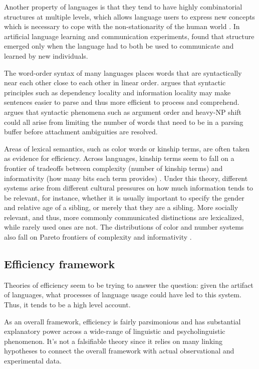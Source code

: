 \documentclass[]{article}
\begin{document}
Another property of languages is that they tend to have highly combinatorial structures at multiple levels, which allows language users to express new concepts which is necessary to cope with the non-stationarity of the human world \cite{kirby2015}. In artificial language learning and communication experiments, \cite{kirby2015} found that structure emerged only when the language had to both be used to communicate and learned by new individuals. 

The word-order syntax of many languages places words that are syntactically near each other close to each other in linear order. \cite{gibson2019} argues that syntactic principles such as dependency locality and information locality  may make sentences easier to parse and thus more efficient to process and comprehend. \cite{hawkins1995} argues that syntactic phenomena such as argument order and heavy-NP shift could all arise from limiting the number of words that need to be in a parsing buffer before attachment ambiguities are resolved. 
 
Areas of lexical semantics, such as color words or kinship terms, are often taken as evidence for efficiency. Across languages, kinship terms seem to fall on a frontier of tradeoffs between complexity (number of kinship terms) and informativity (how many bits each term provides) \cite{kemp2018}. Under this theory, different systems arise from different cultural pressures on how much information tends to be relevant, for instance, whether it is usually important to specify the gender and relative age of a sibling, or merely that they are a sibling. More socially relevant, and thus, more commonly communicated distinctions are lexicalized, while rarely used ones are not. The distributions of color and number systems also fall on Pareto frontiers of complexity and informativity \cite{gibson2019}.

\subsection{Efficiency framework}
Theories of efficiency seem to be trying to answer the question: given the artifact of languages, what processes of language usage could have led to this system. Thus, it tends to be a high level account. 

As an overall framework, efficiency is fairly parsimonious and has substantial explanatory power across a wide-range of linguistic and psycholinguistic phenomenon. It's not a falsifiable theory since it relies on many linking hypotheses to connect the overall framework with actual observational and experimental data. 
\end{document}

